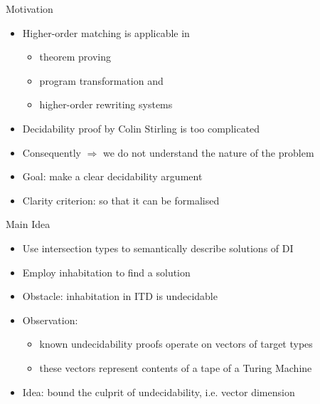 \documentclass{beamer}
\renewcommand{\:}{\mbox{\,:\,}\xspace}
\begin{document}



\begin{frame}{Motivation}
\begin{itemize}
    \item Higher-order matching is applicable in
      \begin{itemize}
      \item theorem proving
      \item program transformation and 
      \item higher-order rewriting systems
      \end{itemize}
    \item Decidability proof by Colin Stirling is too complicated
    \item Consequently $\Rightarrow$ we do not understand the nature of the problem
    \item Goal: make a clear decidability argument
    \item Clarity criterion: so that it can be formalised
\end{itemize}
\end{frame}


\begin{frame}{Main Idea}
  \begin{itemize}
    \item Use intersection types to semantically describe solutions of DI
    \item Employ inhabitation to find a solution\\[2ex]
    \item Obstacle: inhabitation in ITD is undecidable\\[2ex]
    \item Observation:
      \begin{itemize}
      \item known undecidability proofs operate on vectors of
        target types 
      \item these vectors represent contents of a tape of a Turing Machine
      \end{itemize}%
    \item Idea: bound the culprit of undecidability, i.e. vector dimension
    \end{itemize}
\end{frame}

\end{document}
